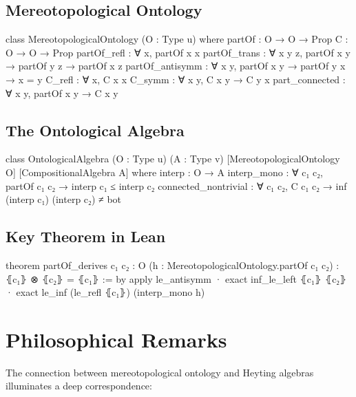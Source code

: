 \documentclass{itt-lean}
\begin{document}
\subsection{Mereotopological Ontology}

\begin{leancode}
class MereotopologicalOntology (O : Type u) where
  partOf : O → O → Prop
  C : O → O → Prop
  partOf_refl : ∀ x, partOf x x
  partOf_trans : ∀ {x y z}, partOf x y → partOf y z → partOf x z
  partOf_antisymm : ∀ {x y}, partOf x y → partOf y x → x = y
  C_refl : ∀ x, C x x
  C_symm : ∀ {x y}, C x y → C y x
  part_connected : ∀ {x y}, partOf x y → C x y
\end{leancode}

\subsection{The Ontological Algebra}

\begin{leancode}
class OntologicalAlgebra (O : Type u) (A : Type v)
    [MereotopologicalOntology O] [CompositionalAlgebra A] where
  interp : O → A
  interp_mono : ∀ {c₁ c₂}, partOf c₁ c₂ → interp c₁ ≤ interp c₂
  connected_nontrivial : ∀ {c₁ c₂}, C c₁ c₂ → 
    inf (interp c₁) (interp c₂) ≠ bot
\end{leancode}

\subsection{Key Theorem in Lean}

\begin{leancode}
theorem partOf_derives {c₁ c₂ : O}
    (h : MereotopologicalOntology.partOf c₁ c₂) :
    ⦃c₁⦄ ⊗ ⦃c₂⦄ = ⦃c₁⦄ := by
  apply le_antisymm
  · exact inf_le_left ⦃c₁⦄ ⦃c₂⦄
  · exact le_inf (le_refl ⦃c₁⦄) (interp_mono h)
\end{leancode}

\section{Philosophical Remarks}

The connection between mereotopological ontology and Heyting algebras illuminates a deep correspondence:
\end{document}
